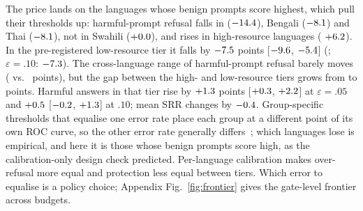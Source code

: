 \documentclass{article}
\newcommand{\ci}[2]{{\small[$#1$, $#2$]}}
\begin{document}
The price lands on the languages whose benign prompts score highest, which pull their thresholds up: harmful-prompt refusal falls in \CtlFiveHrrLossLang{} ($-14.4$), Bengali ($-8.1$) and Thai ($-8.1$), not in Swahili ($+0.0$), and rises in high-resource languages (\CtlFiveHrrGainLang{} $+6.2$). In the pre-registered low-resource tier it falls by $-7.5$ points \ci{\CtlFiveLrlHrrLo}{\CtlFiveLrlHrrHi} (\CtlFivePtwoHolm; $\varepsilon{=}.10$: $-7.3$). The cross-language range of harmful-prompt refusal barely moves (\CtlFivePoolHrrRange{} vs.\ \CtlFiveEorsHrrRange{} points), but the gap between the high- and low-resource tiers grows from \CtlFivePoolTierGap{} to \CtlFiveEorsTierGap{} points. Harmful answers in that tier rise by $+1.3$ points \ci{\CtlFiveLrlUnsafeLo}{\CtlFiveLrlUnsafeHi} at $\varepsilon{=}.05$ and $+0.5$ \ci{\CtlTenLrlUnsafeLo}{\CtlTenLrlUnsafeHi} at $.10$; mean SRR changes by $-0.4$.
Group-specific thresholds that equalise one error rate place each group at a different point of its own ROC curve, so the other error rate generally differs~\citep{hardt2016equality}; which languages lose is empirical, and here it is those whose benign prompts score high, as the calibration-only design check predicted. Per-language calibration makes over-refusal more equal and protection less equal between tiers. Which error to equalise is a policy choice; Appendix Fig.~\ref{fig:frontier} gives the gate-level frontier across budgets.
\end{document}
